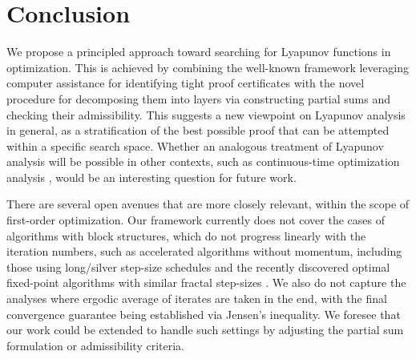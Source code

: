 \documentclass{article}
\theoremstyle{definition}
\theoremstyle{plain}
\begin{document}
\section{Conclusion}

We propose a principled approach toward searching for Lyapunov functions in optimization.
This is achieved by combining the well-known framework leveraging computer assistance for identifying tight proof certificates with the novel procedure for decomposing them into layers via constructing partial sums and checking their admissibility. 
This suggests a new viewpoint on Lyapunov analysis in general, as a stratification of the best possible proof that can be attempted within a specific search space.
Whether an analogous treatment of Lyapunov analysis will be possible in other contexts, such as continuous-time optimization analysis \cite{SuBoydCandes2014_differential, 
SuBoydCandes2016_differential, 
KricheneBayenBartlett2015_accelerated, WibisonoWilsonJordan2016_variational, AttouchChbaniPeypouquetRedont2018_fast, DiakonikolasJordan2021_generalized, WilsonRechtJordan2021_lyapunov, SuhRohRyu2022_continuoustime, BotCsetnekNguyen2023_fast, MoucerTaylorBach2023_systematic, SuhParkRyu2023_continuoustime},
would be an interesting question for future work.

There are several open avenues that are more closely relevant, within the scope of first-order optimization.
Our framework currently does not cover the cases of algorithms with block structures, which do not progress linearly with the iteration numbers, 
such as accelerated algorithms without momentum, including those using long/silver step-size schedules 
\cite{grimmerProvablyFasterGradient2024, altschulerAccelerationStepsizeHedging2025, altschulerAccelerationStepsizeHedging2025a, grimmerAcceleratedObjectiveGap2025, GrimmerShuWang2025_composing, BokAltschuler2025_accelerating, ParkRoySiegelBhattacharya2025_acceleration, zhangAnytimeAccelerationGradient2025, WangMaYangZhou2026_relaxed, ZhangJiang2026_accelerated} 
and the recently discovered optimal fixed-point algorithms with similar fractal step-sizes \cite{yoon2026theorycompositiondualityextremal}. 
We also do not capture the analyses where ergodic average of iterates are taken in the end, with the final convergence guarantee being established via Jensen's inequality.
We foresee that our work could be extended to handle such settings by adjusting the partial sum formulation or admissibility criteria.




\end{document}
